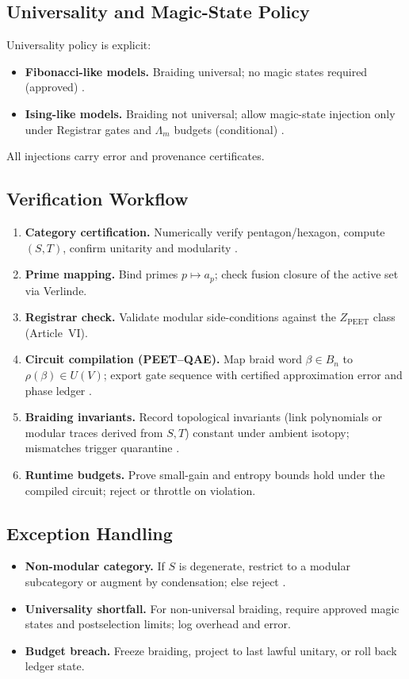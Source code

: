 \documentclass[12pt]{amsart}
\theoremstyle{plain}
\begin{document}
\subsection{Universality and Magic-State Policy}
Universality policy is explicit:
\begin{itemize}
  \item \textbf{Fibonacci-like models.} Braiding universal; no magic states required (approved) \cite{freedman2003topological,nayak2008nonabelian}.
  \item \textbf{Ising-like models.} Braiding not universal; allow magic-state injection only under Registrar gates and $\Lambda_m$ budgets (conditional) \cite{kitaev2003fault,nayak2008nonabelian,pachos2012introduction}.
\end{itemize}
All injections carry error and provenance certificates.

\subsection{Verification Workflow}
\begin{enumerate}
  \item \textbf{Category certification.} Numerically verify pentagon/hexagon, compute $(S,T)$, confirm unitarity and modularity \cite{etingof2015tensor}.
  \item \textbf{Prime mapping.} Bind primes $p\mapsto a_p$; check fusion closure of the active set via Verlinde.
  \item \textbf{Registrar check.} Validate modular side-conditions against the $Z_{\mathrm{PEET}}$ class (Article~VI).
  \item \textbf{Circuit compilation (PEET–QAE).} Map braid word $\beta\in B_n$ to $\rho(\beta)\in U(V)$; export gate sequence with certified approximation error and phase ledger \cite{kitaev2003fault,pachos2012introduction,nayak2008nonabelian}.
  \item \textbf{Braiding invariants.} Record topological invariants (link polynomials or modular traces derived from $S,T$) constant under ambient isotopy; mismatches trigger quarantine \cite{freedman2003topological,nayak2008nonabelian}.
  \item \textbf{Runtime budgets.} Prove small-gain and entropy bounds hold under the compiled circuit; reject or throttle on violation.
\end{enumerate}

\subsection{Exception Handling}
\begin{itemize}
  \item \textbf{Non-modular category.} If $S$ is degenerate, restrict to a modular subcategory or augment by condensation; else reject \cite{etingof2015tensor}.
  \item \textbf{Universality shortfall.} For non-universal braiding, require approved magic states and postselection limits; log overhead and error.
  \item \textbf{Budget breach.} Freeze braiding, project to last lawful unitary, or roll back ledger state.
\end{itemize}
\end{document}
